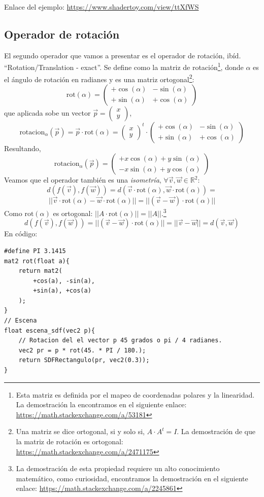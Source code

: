 Enlace del ejemplo:
\url{https://www.shadertoy.com/view/ttXfWS}

\subsection{Operador de rotación}
El segundo operador que vamos a presentar es el operador de rotación, ibíd. \enquote{Rotation/Translation - exact}. Se define como la matriz de rotación\footnote{Esta matriz es definida por el mapeo de coordenadas polares y la linearidad. La demostración la encontramos en el siguiente enlace: \url{https://math.stackexchange.com/a/53181}}, donde \(\alpha\) es el ángulo de rotación en radianes y es una matriz ortogonal\footnote{Una matriz se dice ortogonal, si y solo si, \(A\cdot A^t=I\). La demostración de que la matriz de rotación es ortogonal:  \url{https://math.stackexchange.com/a/2471175}}:
\[ 
\text{rot}(\alpha)=\begin{pmatrix}
    +\cos(\alpha) & -\sin(\alpha)\\
    +\sin(\alpha) & +\cos(\alpha)
\end{pmatrix}
\]
que aplicada sobe un vector \(\Vec{p}=\begin{pmatrix}
    x\\
    y
\end{pmatrix}\),
\[ 
\text{rotacion}_\alpha(\Vec{p})=\Vec{p}\cdot\text{rot}(\alpha)=\begin{pmatrix}
    x\\
    y
\end{pmatrix}^t\cdot\begin{pmatrix}
    +\cos(\alpha) & -\sin(\alpha)\\
    +\sin(\alpha) & +\cos(\alpha)
\end{pmatrix}
\]
Resultando,
\[\text{rotacion}_\alpha(\Vec{p})=\begin{pmatrix}
    +x\cos(\alpha) + y\sin(\alpha)\\
    -x\sin(\alpha) + y\cos(\alpha)
\end{pmatrix}
\]
Veamos que el operador también es una \textit{isometría}, \(\forall \Vec{v},\Vec{w}\in\mathbb{R}^2\):
\[d(f(\Vec{v}), f(\Vec{w}))=d(\Vec{v}\cdot \text{rot}(\alpha), \Vec{w}\cdot \text{rot}(\alpha))=\]\[\vert\vert \Vec{v}\cdot \text{rot}(\alpha)- \Vec{w}\cdot \text{rot}(\alpha)\vert\vert=\vert\vert(\Vec{v}-\Vec{w})\cdot \text{rot}(\alpha)\vert\vert\]
Como \(\text{rot}(\alpha)\) es ortogonal: \(\vert\vert A\cdot\text{rot}(\alpha)\vert\vert=\vert\vert A\vert\vert\).\footnote{La demostración de esta propiedad requiere un alto conocimiento matemático, como curiosidad, encontramos la demostración en el siguiente enlace: \url{https://math.stackexchange.com/a/2245861}}
\[d(f(\Vec{v}), f(\Vec{w}))=\vert\vert(\Vec{v}-\Vec{w})\cdot \text{rot}(\alpha)\vert\vert=\vert\vert\Vec{v}-\Vec{w}\vert\vert=d(\Vec{v},\Vec{w})\]
En código:
\begin{lstlisting}
#define PI 3.1415
mat2 rot(float a){
    return mat2(
        +cos(a), -sin(a), 
        +sin(a), +cos(a)
    );
}
// Escena
float escena_sdf(vec2 p){
    // Rotacion del el vector p 45 grados o pi / 4 radianes.
    vec2 pr = p * rot(45. * PI / 180.);
    return SDFRectangulo(pr, vec2(0.3));
}
\end{lstlisting}

